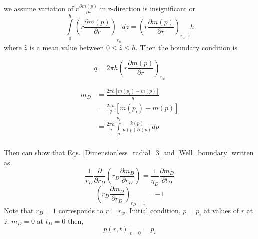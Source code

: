 \documentclass{llncs}
\numberwithin{equation}{section}
\numberwithin{figure}{section}
\numberwithin{table}{section}
\begin{document}
     we assume  variation of $r\frac{\partial m\left( p \right)}{\partial r}$ in z-direction is insignificant or
    \begin{equation*}
    {{\int\limits_{0}^{h}{\left( r\frac{\partial m\left( p \right)}{\partial r} \right)}}_{{{r}_{w}}}}dz={{\left( r\frac{\partial m\left( p \right)}{\partial r} \right)}_{{{r}_{w}},\widehat{z}}}h
    \end{equation*}
    where $\widehat{z}$ is a mean value between $0\leq \widehat{z} \leq h$. Then the boundary condition is


    \begin{equation}
        q=2\pi h{{\left( r\frac{\partial m\left( p \right)}{\partial r} \right)}_{{{r}_{w}}}}
        \label{Well_boundary}
    \end{equation}

    \begin{equation}
        \begin{split}
         {{m}_{D}}&=\frac{2\pi h\left[ m\left( {{p}_{i}} \right)-m\left( p \right) \right]}{q} \\
        & =\frac{2\pi h}{q}\left[ m\left( {{p}_{i}} \right)-m\left( p \right) \right] \\
        & =\frac{2\pi h}{q}\int\limits_{p}^{{{p}_{i}}}{\frac{k\left( p \right)}{\mu \left( p \right)B\left( p \right)}dp} \\
        \end{split}
        \label{mD_definition}
    \end{equation}

    Then  can show that Eqs. \ref{Dimensionless_radial_3} and \ref{Well_boundary} written as
    \begin{equation}
            \frac{1}{{{r}_{D}}}\frac{\partial }{\partial {{r}_{D}}}\left( {{r}_{D}}\frac{\partial {{m}_{D}}}{\partial {{r}_{D}}} \right)=\frac{1}{{{\eta }_{D}}}\frac{\partial {{m}_{D}}}{\partial {{t}_{D}}}
        \label{Dimensionless_radial_4}
    \end{equation}
    \begin{equation}
            {{\left( {{r}_{D}}\frac{\partial {{m}_{D}}}{\partial {{r}_{D}}} \right)}_{{{r}_{D}}=1}}=-1
        \label{Well_boundary_2}
    \end{equation}
    Note that $r_{D}=1$ corresponds to $r=r_{w}$.
    Initial condition, $p=p_{i}$ at values of $r$ at $\widehat{z}$.
    $m_{D}=0$ at $t_{D}=0$ then,
    \begin{equation}
        {{\left. p\left( r,t \right) \right|}_{t=0}}={{p}_{i}}
        \label{initial_condition}
    \end{equation}
\end{document}
